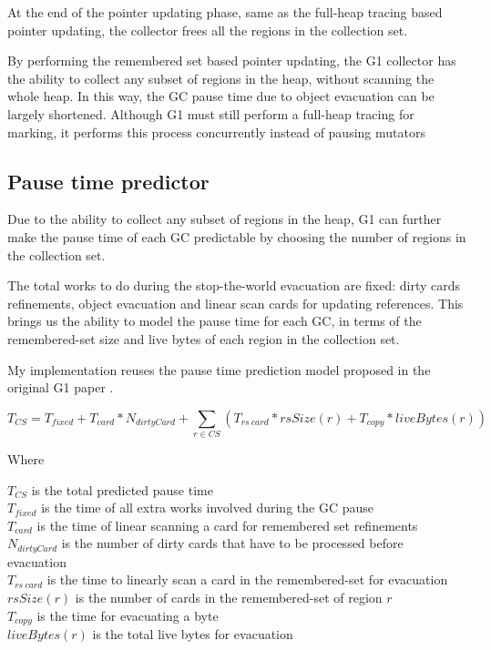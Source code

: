At the end of the pointer updating phase, same as the full-heap tracing based
pointer updating, the collector frees all the regions in the collection set.

By performing the remembered set based pointer updating, the G1 collector has the ability to collect
any subset of regions in the heap, without scanning the whole heap. In this way, the GC pause time due to object evacuation
can be largely shortened. Although G1 must still perform a full-heap tracing for marking, it performs this
process concurrently instead of pausing mutators

\subsection{Pause time predictor}

Due to the ability to collect any subset of regions in the heap, G1 can further
make the pause time of each GC predictable by choosing the number of regions in the collection set.

The total works to do during the stop-the-world evacuation are fixed:
dirty cards refinements, object evacuation and linear scan cards for updating references.
This brings us the ability to model the pause time for each GC, in terms of the remembered-set
size and live bytes of each region in the collection set.

My implementation reuses the pause time prediction model proposed in the
original G1 paper \citep{detlefs2004garbage}.

$$
T_{CS} = T_{fixed} + T_{card} * N_{dirtyCard} + \sum_{r\in CS} (T_{rs\ card} * rsSize(r) + T_{copy} * liveBytes(r))
$$

\noindent Where

\noindent$T_{CS}$ is the total predicted pause time\\
$T_{fixed}$ is the time of all extra works involved during the GC pause\\
$T_{card}$ is the time of linear scanning a card for remembered set refinements\\
$N_{dirtyCard}$ is the number of dirty cards that have to be processed before evacuation\\
$T_{rs\ card}$ is the time to linearly scan a card in the remembered-set for evacuation\\
$rsSize(r)$ is the number of cards in the remembered-set of region $r$\\
$T_{copy}$ is the time for evacuating a byte\\
$liveBytes(r)$ is the total live bytes for evacuation\\

